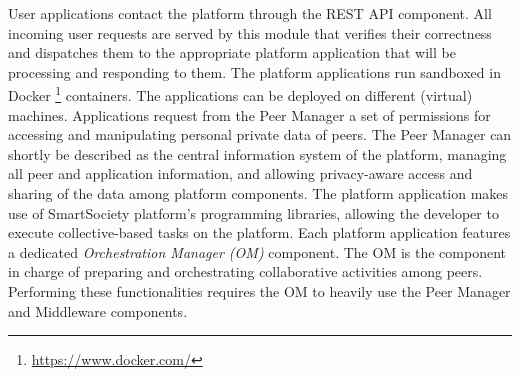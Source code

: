User applications contact the platform through the REST API component.
All incoming user requests are served by this module that verifies their correctness and dispatches them to the appropriate platform application that will be processing and responding to them. 
The platform applications run sandboxed in Docker \footnote{\url{https://www.docker.com/}} containers. The applications can be deployed on different (virtual) machines.
%
%
Applications request from the Peer Manager a set of permissions for accessing and manipulating personal private data of peers. The Peer Manager can shortly be described as the central information system of the platform, managing all peer and application information, and allowing privacy-aware access and sharing of the data among platform components. 
%
The platform application %
makes use of SmartSociety platform's programming libraries, allowing the developer to execute collective-based tasks on the platform. %
%
Each platform application features a dedicated \emph{Orchestration Manager (OM)} component. The OM is the component in charge of preparing and orchestrating collaborative activities among peers. Performing these functionalities requires the OM to heavily use the Peer Manager and \mdl{} Middleware components. 


